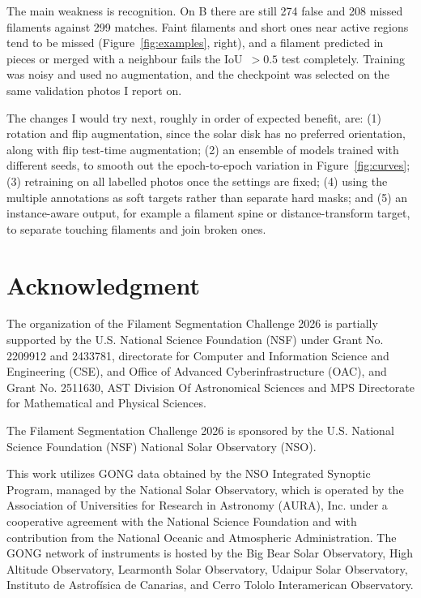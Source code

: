 \documentclass[sigconf]{acmart}
\begin{document}
The main weakness is recognition. On B there are still 274 false and 208 missed filaments against 299 matches. Faint filaments and short ones near active regions tend to be missed (Figure~\ref{fig:examples}, right), and a filament predicted in pieces or merged with a neighbour fails the IoU~$>0.5$ test completely. Training was noisy and used no augmentation, and the checkpoint was selected on the same validation photos I report on.

The changes I would try next, roughly in order of expected benefit, are: (1) rotation and flip augmentation, since the solar disk has no preferred orientation, along with flip test-time augmentation; (2) an ensemble of models trained with different seeds, to smooth out the epoch-to-epoch variation in Figure~\ref{fig:curves}; (3) retraining on all labelled photos once the settings are fixed; (4) using the multiple annotations as soft targets rather than separate hard masks; and (5) an instance-aware output, for example a filament spine or distance-transform target, to separate touching filaments and join broken ones.


\section{Acknowledgment}\label{sec:acknowledgment}
    The organization of the Filament Segmentation Challenge 2026 is partially supported by the U.S. National Science Foundation (NSF) under Grant No. 2209912 and 2433781, directorate for Computer and Information Science and Engineering (CSE), and Office of Advanced Cyberinfrastructure (OAC), and Grant No. 2511630, AST Division Of Astronomical Sciences and MPS Directorate for Mathematical and Physical Sciences.

    The Filament Segmentation Challenge 2026 is sponsored by the U.S. National Science Foundation (NSF) National Solar Observatory (NSO).

    This work utilizes GONG data obtained by the NSO Integrated Synoptic Program, managed by the National Solar Observatory, which is operated by the Association of Universities for Research in Astronomy (AURA), Inc. under a cooperative agreement with the National Science Foundation and with contribution from the National Oceanic and Atmospheric Administration. The GONG network of instruments is hosted by the Big Bear Solar Observatory, High Altitude Observatory, Learmonth Solar Observatory, Udaipur Solar Observatory, Instituto de Astrofísica de Canarias, and Cerro Tololo Interamerican Observatory.



\end{document}
